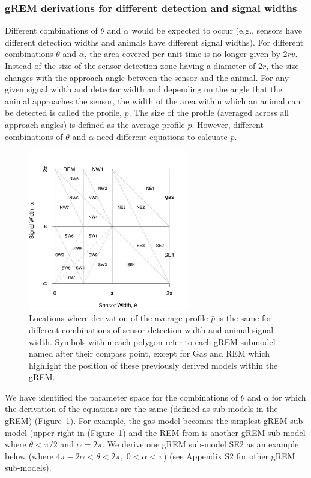 \documentclass[a4paper,10pt,reqno,oneside]{amsart}
\begin{document}
\subsubsection{gREM derivations for different detection and signal widths}
Different combinations of $\theta$ and $\alpha$ would be expected to occur (e.g., sensors have different detection widths and animals have different signal widths). For different combinations $\theta$ and $\alpha$, the area covered per unit time is no longer given by $2rv$. Instead of the size of the sensor detection zone having a diameter of $2r$, the size changes with the approach angle between the sensor and the animal. For any given signal width and detector width and depending on the angle that the animal approaches the sensor, the width of the area within which an animal can be detected is called the profile, $p$. The size of the profile (averaged across all approach angles) is defined as the average profile $\bar{p}$. However, different combinations of $\theta$ and $\alpha$ need different equations to calcuate $\bar{p}$. 

\begin{figure}
\centering
\includegraphics[width=7cm]{imgs/equalRegions.pdf}
\caption{Locations where derivation of the average profile $\bar{p}$ is the same for different combinations of sensor detection width and animal signal width. Symbols within each polygon refer to each gREM submodel named after their compass point, except for Gas and REM which highlight the position of these previously derived models within the gREM.}
\label{f:equalRegions}
\end{figure}

We have identified the parameter space for the combinations of $\theta$ and $\alpha$ for which the derivation of the equations are the same (defined as sub-models in the gREM) (Figure~\ref{f:equalRegions}). For example, the gas model becomes the simplest gREM sub-model (upper right in (Figure~\ref{f:equalRegions}) and the REM from \citep{rowcliffe2008estimating} is another gREM sub-model where $\theta<\pi/2$ and $\alpha = 2\pi$. We derive one gREM sub-model SE2 as an example below (where $4 \pi - 2 \alpha < \theta < 2\pi ,\; 0 < \alpha <\pi$) (see Appendix S2 for other gREM sub-models).
\end{document}
